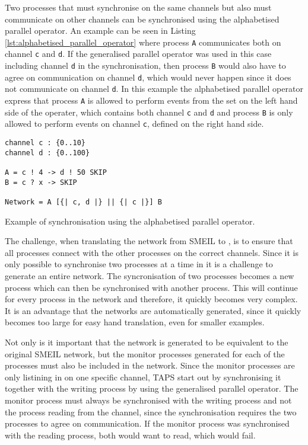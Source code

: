 Two processes that must synchronise on the same channels but also must communicate on other channels can be synchronised using the alphabetised parallel operator. An example can be seen in Listing \ref{lst:alphabetised_parallel_operator} where process \texttt{A} communicates both on channel \texttt{c} and \texttt{d}. If the generalised parallel operator was used in this case including channel \texttt{d} in the synchronisation, then process \texttt{B} would also have to agree on communication on channel \texttt{d}, which would never happen since it does not communicate on channel \texttt{d}.
In this example the alphabetised parallel operator express that process \texttt{A} is allowed to perform events from the set on the left hand side of the operater, which contains both channel \texttt{c} and \texttt{d} and process \texttt{B} is only allowed to perform events on channel \texttt{c}, defined on the right hand side.
\begin{listing}
\begin{verbatim}
channel c : {0..10}
channel d : {0..100}

A = c ! 4 -> d ! 50 SKIP
B = c ? x -> SKIP

Network = A [{| c, d |} || {| c |}] B
\end{verbatim}
\caption{Example of synchronisation using the alphabetised parallel operator.}
\label{lst:alphabetised_parallel_operator}
\end{listing}


The challenge, when translating the network from SMEIL to \cspm{}, is to ensure that all processes connect with the other processes on the correct channels.
Since it is only possible to synchronise two processes at a time in \cspm{} it is a challenge to generate an entire network. The syncronisation of two processes becomes a new process which can then be synchronised with another process. This will continue for every process in the network and therefore, it quickly becomes very complex. It is an advantage that the \cspm{} networks are automatically generated, since it quickly becomes too large for easy hand translation, even for smaller examples.

Not only is it important that the network is generated to be equivalent to the original SMEIL network, but the monitor processes generated for each of the \cspm{} processes must also be included in the network. Since the monitor processes are only listining in on one specific channel, TAPS start out by synchronising it together with the writing process by using the generalised parallel operator.
The monitor process must always be synchronised with the writing process and not the process reading from the channel, since the synchronisation requires the two processes to agree on communication. If the monitor process was synchronised with the reading process, both would want to read, which would fail.


